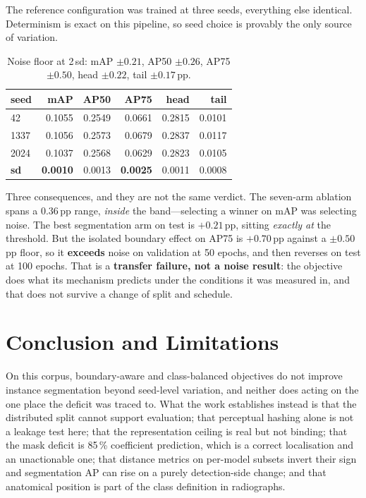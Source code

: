 \documentclass[11pt,letterpaper]{article}
\begin{document}
The reference configuration was trained at three seeds, everything else
identical. Determinism is exact on this pipeline, so seed choice is provably the
only source of variation.

\begin{table}[h]
\centering\small
\begin{tabular}{lrrrrr}
\toprule
seed & mAP & AP50 & AP75 & head & tail \\
\midrule
42 & 0.1055 & 0.2549 & 0.0661 & 0.2815 & 0.0101 \\
1337 & 0.1056 & 0.2573 & 0.0679 & 0.2837 & 0.0117 \\
2024 & 0.1037 & 0.2568 & 0.0629 & 0.2823 & 0.0105 \\
\midrule
\textbf{sd} & \textbf{0.0010} & 0.0013 & \textbf{0.0025} & 0.0011 & 0.0008 \\
\bottomrule
\end{tabular}
\caption{Noise floor at 2\,sd: mAP $\pm0.21$, AP50 $\pm0.26$,
AP75 $\pm0.50$, head $\pm0.22$, tail $\pm0.17$\,pp.}
\end{table}

Three consequences, and they are not the same verdict. The seven-arm ablation
spans a 0.36\,pp range, \emph{inside} the band---selecting a winner on mAP was
selecting noise. The best segmentation arm on test is $+0.21$\,pp, sitting
\emph{exactly at} the threshold. But the isolated boundary effect on AP75 is
$+0.70$\,pp against a $\pm0.50$\,pp floor, so it \textbf{exceeds} noise on
validation at 50 epochs, and then reverses on test at 100 epochs. That is a
\textbf{transfer failure, not a noise result}: the objective does what its
mechanism predicts under the conditions it was measured in, and that does not
survive a change of split and schedule.

\section{Conclusion and Limitations}

On this corpus, boundary-aware and class-balanced objectives do not improve
instance segmentation beyond seed-level variation, and neither does acting on
the one place the deficit was traced to. What the work establishes instead is
that the distributed split cannot support evaluation; that perceptual hashing
alone is not a leakage test here; that the representation ceiling is real but
not binding; that the mask deficit is 85\,\% coefficient prediction, which is a
correct localisation and an unactionable one; that distance metrics on
per-model subsets invert their sign and segmentation AP can rise on a purely
detection-side change; and that anatomical position is part of the class
definition in radiographs.
\end{document}
